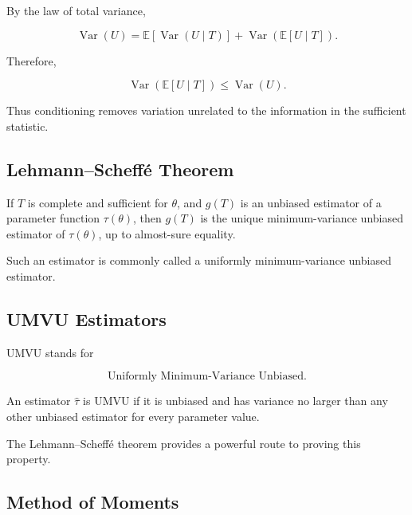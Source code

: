 By the law of total variance,

\[
\operatorname{Var}(U)
=
\mathbb{E}
[
\operatorname{Var}(U\mid T)
]
+
\operatorname{Var}
(
\mathbb{E}[U\mid T]
).
\]

Therefore,

\[
\operatorname{Var}
(
\mathbb{E}[U\mid T]
)
\leq
\operatorname{Var}(U).
\]

Thus conditioning removes variation unrelated to the information in the
sufficient statistic.

\subsection{Lehmann--Scheff\'e Theorem}
\label{subsec:lehmann-scheffe}

\begin{theorem}
If \(T\) is complete and sufficient for \(\theta\), and \(g(T)\) is an
unbiased estimator of a parameter function \(\tau(\theta)\), then
\(g(T)\) is the unique minimum-variance unbiased estimator of
\(\tau(\theta)\), up to almost-sure equality.
\end{theorem}

Such an estimator is commonly called a uniformly minimum-variance
unbiased estimator.

\subsection{UMVU Estimators}
\label{subsec:umvu-estimators}

UMVU stands for

\[
\boxed{
\text{Uniformly Minimum-Variance Unbiased}.
}
\]

An estimator \(\widehat{\tau}\) is UMVU if it is unbiased and has variance
no larger than any other unbiased estimator for every parameter value.

The Lehmann--Scheff\'e theorem provides a powerful route to proving this
property.

\subsection{Method of Moments}
\label{subsec:method-of-moments}


